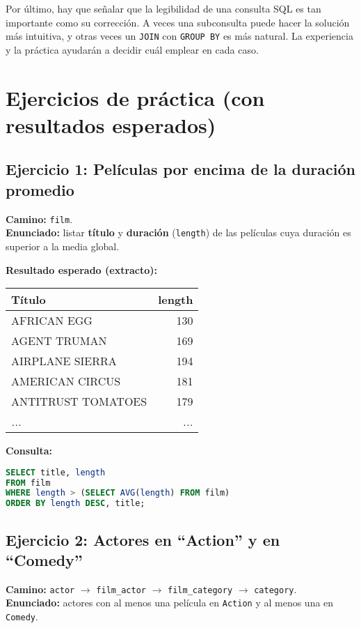 \documentclass[12pt,a4paper]{article}
\begin{document}
Por último, hay que señalar que la legibilidad de una consulta SQL es tan importante como su corrección.
%
A veces una subconsulta puede hacer la solución más intuitiva, y otras veces un \texttt{JOIN} con \texttt{GROUP BY} es más natural.
%
La experiencia y la práctica ayudarán a decidir cuál emplear en cada caso.


\section{Ejercicios de práctica (con resultados esperados)}

\subsection*{Ejercicio 1: Películas por encima de la duración promedio}
\textbf{Camino:} \texttt{film}. \\
\textbf{Enunciado:} listar \textbf{título} y \textbf{duración} (\texttt{length}) de las películas cuya duración es superior a la media global.

\textbf{Resultado esperado (extracto):}
\begin{center}
\begin{tabular}{l r}
\hline
Título & length \\
\hline
AFRICAN EGG             & 130 \\
AGENT TRUMAN            & 169 \\
AIRPLANE SIERRA         & 194 \\
AMERICAN CIRCUS         & 181 \\
ANTITRUST TOMATOES      & 179 \\
\textit{...}            & \textit{...} \\
\hline
\end{tabular}
\end{center}

\textbf{Consulta:}
\begin{lstlisting}[language=SQL]
SELECT title, length
FROM film
WHERE length > (SELECT AVG(length) FROM film)
ORDER BY length DESC, title;
\end{lstlisting}



\subsection*{Ejercicio 2: Actores en ``Action'' y en ``Comedy''}
\textbf{Camino:} \texttt{actor} $\rightarrow$ \texttt{film\_actor} $\rightarrow$ \texttt{film\_category} $\rightarrow$ \texttt{category}. \\
\textbf{Enunciado:} actores con al menos una película en \texttt{Action} y al menos una en \texttt{Comedy}.
\end{document}

